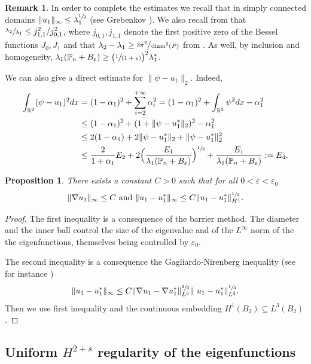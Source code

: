 \documentclass[JEP,XML,SOM,Unicode,ThmDefs,NoFloatCountersInSection,published]{cedram}
\newcommand{\spfrac}[2]{\sfrac{#1}{(#2)}}
\theoremstyle{plain}
\newtheorem{propo}[thm]{Proposition}
\theoremstyle{definition}
\newtheorem{rem}[thm]{Remark}
\newcommand{\diam}{\operatorname{diam}}
\let\Bbb\mathbb
\newcommand{\vps}{\varepsilon}
\newcommand{\lb}{\lambda}
\newcommand{\sq}{\subseteq}
\begin{document}
\begin{rem}
In order to complete the estimates we recall that in simply connected domains $\|u_1\|_\infty \le \lb_1^{\sfrac 12}$ (see Grebenkov \cite[For.\,(6.22)]{GrNg13}). We also recall from \cite{AsBe92} that $\sfrac{\lb_2 }{ \lb _1} \le j_{1,1}^2/j_{0,1}^2$, where $j_{0,1}, j_{1,1}$ denote the first positive zero of the Bessel functions $J_0, J_1$ and that $\lb_2-\lb_1\ge \sfrac{3\pi^2}{\diam^2 (P)}$ from \cite{AnCl11}.
As well, by inclusion and homogeneity, $\lb_1(\Bbb{P}_n+ B_\vps) \ge \big (\spfrac{1}{1+\vps} \big)^2 \lb_1^*$.

We can also give a direct estimate for $\|\psi -u_1 \|_2$. Indeed,
\begin{align*}
\int_{\Bbb{R}^2} (\psi -u_1)^2 dx &= (1-\alpha_1)^2+ \sum_{i=2}^{+\infty} \alpha_i^2= (1-\alpha_1)^2+ \int_{\Bbb{R}^2} \psi^2 dx -\alpha_1^2
\\
&\le (1-\alpha_1)^2+(1+ \|\psi -u_1^*\|_2)^2 -\alpha_1^2
\\
&\le 2(1-\alpha_1)+ 2 \|\psi -u_1^*\|_2 + \|\psi -u_1^*\|_2^2
\\
&\le \frac{2}{1+\alpha_1} E_2+ 2\Bigl(\frac{E_1}{\lb_1(\Bbb{P}_n+ B_\vps)}\Bigr)^{\sfrac12}+\frac{E_1}{\lb_1(\Bbb{P}_n+ B_\vps)}:=E_4.
\end{align*}
\end{rem}

\begin{propo}\label{bobu16}
There exists a constant $C>0$ such that for all $0<\vps<\vps _0$
\[
\|\nabla u_1\|_\infty \le C \text{ and }\|u_1-u_1^*\|_\infty \le C \|u_1-u_1^*\|_{H^1}^{\sfrac13}.
\]
\end{propo}
\begin{proof}
The first inequality is a consequence of the barrier method. The diameter and the inner ball control the size of the eigenvalue and of the $L^\infty$ norm of the the eigenfunctions, themselves being controlled by $\vps_0$.

The second inequality is a consequence the Gagliardo-Nirenberg inequality (see for instance \cite{Po20})
\[
\|u_1-u_1^*\|_\infty \le C \|\nabla u_1-\nabla u_1^*\|_{L^3}^{\sfrac 23} \|\ u_1-u_1^*\|_{L^3}^{\sfrac13}.
\]
Then we use first inequality and the continuous embedding $H^1(B_2) \sq L^3(B_2)$.
\end{proof}
\subsection{Uniform $H^{2+s}$ regularity of the eigenfunctions}
\end{document}
